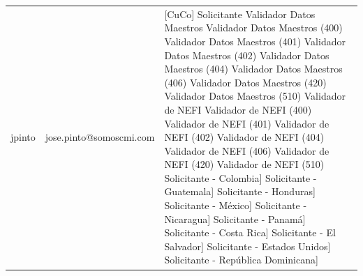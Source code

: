 \begin{longtable}{|c|c|p{7cm}|}
        \\
        \hline
        jpinto & jose.pinto@somoscmi.com & 
        [CuCo] Solicitante \newline
        [CuCo] Validador Datos Maestros \newline
        [CuCo] Validador Datos Maestros (400) \newline
        [CuCo] Validador Datos Maestros (401) \newline
        [CuCo] Validador Datos Maestros (402) \newline
        [CuCo] Validador Datos Maestros (404) \newline
        [CuCo] Validador Datos Maestros (406) \newline
        [CuCo] Validador Datos Maestros (420) \newline
        [CuCo] Validador Datos Maestros (510) \newline
        [CuCo] Validador de NEFI \newline
        [CuCo] Validador de NEFI (400) \newline
        [CuCo] Validador de NEFI (401) \newline
        [CuCo] Validador de NEFI (402) \newline
        [CuCo] Validador de NEFI (404) \newline
        [CuCo] Validador de NEFI (406) \newline
        [CuCo] Validador de NEFI (420) \newline
        [CuCo] Validador de NEFI (510) \newline
        [[CuCo] Solicitante - Colombia] \newline
        [[CuCo] Solicitante - Guatemala] \newline
        [[CuCo] Solicitante - Honduras] \newline
        [[CuCo] Solicitante - México] \newline
        [[CuCo] Solicitante - Nicaragua] \newline
        [[CuCo] Solicitante - Panamá] \newline
        [[CuCo] Solicitante - Costa Rica] \newline
        [[CuCo] Solicitante - El Salvador] \newline
        [[CuCo] Solicitante - Estados Unidos] \newline
        [[CuCo] Solicitante - República Dominicana] 
        \\

\end{longtable}
